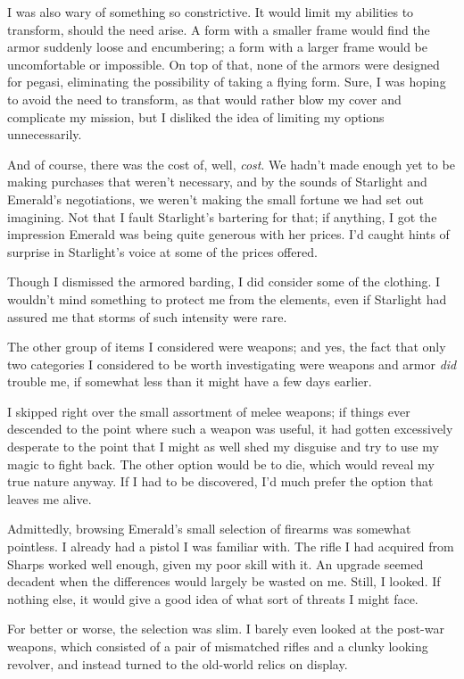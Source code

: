 I was also wary of something so constrictive. It would limit my abilities to transform, should the need arise. A form with a smaller frame would find the armor suddenly loose and encumbering; a form with a larger frame would be uncomfortable or impossible. On top of that, none of the armors were designed for pegasi, eliminating the possibility of taking a flying form. Sure, I was hoping to avoid the need to transform, as that would rather blow my cover and complicate my mission, but I disliked the idea of limiting my options unnecessarily.

And of course, there was the cost of, well, \textit{cost}. We hadn’t made enough yet to be making purchases that weren’t necessary, and by the sounds of Starlight and Emerald’s negotiations, we weren’t making the small fortune we had set out imagining. Not that I fault Starlight’s bartering for that; if anything, I got the impression Emerald was being quite generous with her prices. I’d caught hints of surprise in Starlight’s voice at some of the prices offered.

Though I dismissed the armored barding, I did consider some of the clothing. I wouldn’t mind something to protect me from the elements, even if Starlight had assured me that storms of such intensity were rare.

The other group of items I considered were weapons; and yes, the fact that only two categories I considered to be worth investigating were weapons and armor \textit{did} trouble me, if somewhat less than it might have a few days earlier.

I skipped right over the small assortment of melee weapons; if things ever descended to the point where such a weapon was useful, it had gotten excessively desperate to the point that I might as well shed my disguise and try to use my magic to fight back. The other option would be to die, which would reveal my true nature anyway. If I had to be discovered, I’d much prefer the option that leaves me alive.

Admittedly, browsing Emerald’s small selection of firearms was somewhat pointless. I already had a pistol I was familiar with. The rifle I had acquired from Sharps worked well enough, given my poor skill with it. An upgrade seemed decadent when the differences would largely be wasted on me. Still, I looked. If nothing else, it would give a good idea of what sort of threats I might face.

For better or worse, the selection was slim. I barely even looked at the post-war weapons, which consisted of a pair of mismatched rifles and a clunky looking revolver, and instead turned to the old-world relics on display.

